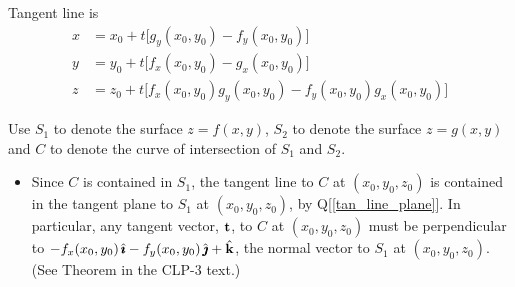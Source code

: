 \begin{answer}
Tangent line is
\begin{align*}
x&=x_0+t\big[g_y(x_0,y_0)-f_y(x_0,y_0)\big] \\
y&=y_0+t\big[f_x(x_0,y_0)-g_x(x_0,y_0)\big] \\
z&=z_0+ t\big[f_x(x_0,y_0)g_y(x_0,y_0)-f_y(x_0,y_0)g_x(x_0,y_0)\big]
\end{align*}
\end{answer}

\begin{solution}
Use $S_1$ to denote the surface $z=f(x,y)$, 
    $S_2$ to denote the surface $z=g(x,y)$ and 
    $C$ to denote the curve of intersection of $S_1$ and $S_2$.
\begin{itemize}
\item
Since $C$ is contained in $S_1$, the tangent line to $C$ at $(x_0,y_0,z_0)$
is contained in the tangent plane to $S_1$ at $(x_0,y_0,z_0)$, by 
Q[\ref{tan_line_plane}]. In particular, any tangent vector, $\mathbf{t}$, to 
$C$ at $(x_0,y_0,z_0)$ must be perpendicular to $-f_x(x_0,y_0)\,\hat{\pmb{\imath}}
-f_y(x_0,y_0)\,\hat{\pmb{\jmath}}+\hat{\mathbf{k}}$,
the normal vector to $S_1$ at $(x_0,y_0,z_0)$.
(See Theorem  in the CLP-3 text.)


\end{itemize}
\end{solution}
